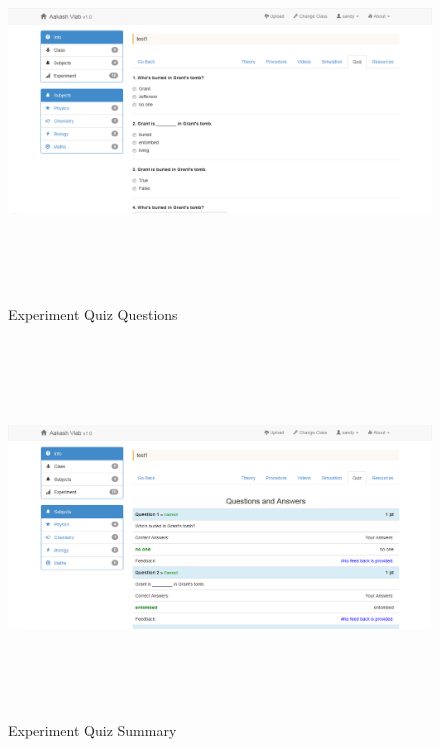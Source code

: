 \documentclass[12pt]{report}
\begin{document}
\begin{figure}[H]
 \centering 
 \includegraphics[width=15cm, height=10cm]{./313.jpg}
 \caption{Experiment Quiz Questions \label{fig:313}}
\end{figure}
\begin{figure}[H]
 \centering 
 \includegraphics[width=15cm, height=10cm]{./314.jpg}
 \caption{Experiment Quiz Summary\label{fig:314}}
\end{figure}
\end{document}
